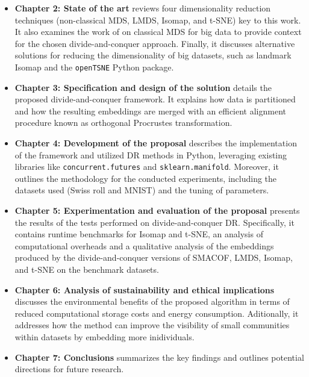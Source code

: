 \begin{itemize}
    \item \textbf{Chapter 2: State of the art} reviews four dimensionality reduction techniques (non-classical MDS, LMDS, Isomap, and t-SNE) key to this work. It also examines the work of \citet{Delicado2024} on classical MDS for big data to provide context for the chosen divide-and-conquer approach. Finally, it discusses alternative solutions for reducing the dimensionality of big datasets, such as landmark Isomap and the \verb|openTSNE| Python package.
    \item \textbf{Chapter 3: Specification and design of the solution} details the proposed divide-and-conquer framework. It explains how data is partitioned and how the resulting embeddings are merged with an efficient alignment procedure known as orthogonal Procrustes transformation.
    \item \textbf{Chapter 4: Development of the proposal} describes the implementation of the framework and utilized DR methods in Python, leveraging existing libraries like \verb|concurrent.futures| and \verb|sklearn.manifold|. Moreover, it outlines the methodology for the conducted experiments, including the datasets used (Swiss roll and MNIST) and the tuning of parameters.
    \item \textbf{Chapter 5: Experimentation and evaluation of the proposal} presents the results of the tests performed on divide-and-conquer DR. Specifically, it contains runtime benchmarks for Isomap and t-SNE, an analysis of computational overheads and a qualitative analysis of the embeddings produced by the divide-and-conquer versions of SMACOF, LMDS, Isomap, and t-SNE on the benchmark datasets.
    \item \textbf{Chapter 6: Analysis of sustainability and ethical implications} discusses the environmental benefits of the proposed algorithm in terms of reduced computational storage costs and energy consumption. Aditionally, it addresses how the method can improve the visibility of small communities within datasets by embedding more inidividuals.
    \item \textbf{Chapter 7: Conclusions} summarizes the key findings and outlines potential directions for future research. 
\end{itemize}